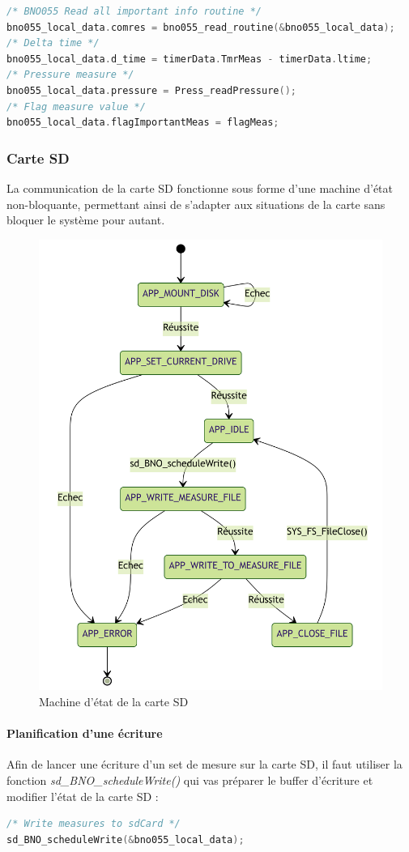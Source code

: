 {	\begin{lstlisting}[frame=single, language=C, caption={Code lecture des données par la librairie}, captionpos=b, breaklines=true]
/* BNO055 Read all important info routine */
bno055_local_data.comres = bno055_read_routine(&bno055_local_data);
/* Delta time */
bno055_local_data.d_time = timerData.TmrMeas - timerData.ltime;
/* Pressure measure */
bno055_local_data.pressure = Press_readPressure();
/* Flag measure value */
bno055_local_data.flagImportantMeas = flagMeas;
	\end{lstlisting}

	\subsubsection{Carte SD}
	La  communication de la carte SD fonctionne sous forme d'une machine d'état non-bloquante, permettant ainsi de s'adapter aux situations de la carte sans bloquer le système pour autant.
	
	\begin{figure}[h]
		\centering
		\includegraphics[width=0.6\linewidth]{Figures/Dev-SOFT/mermaid-diagram-2023-06-14-162436}
		\caption{Machine d'état de la carte SD}
		\label{fig:mermaid-diagram-2023-06-14-162436}
	\end{figure}

	\clearpage
	
	\paragraph{Planification d'une écriture}
	Afin de lancer une écriture d'un set de mesure sur la carte SD, il faut utiliser la fonction \textit{sd\_BNO\_scheduleWrite()} qui vas préparer le buffer d'écriture et modifier l'état de la carte SD : 
	\begin{lstlisting}[frame=single, language=C, caption={Lancement d'une écriture sur la carte SD}, captionpos=b, breaklines=true]
/* Write measures to sdCard */
sd_BNO_scheduleWrite(&bno055_local_data);
	\end{lstlisting}
	
}
